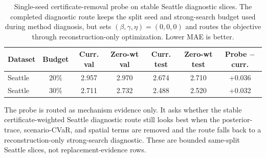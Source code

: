 \begin{table}[pos=htbp]
\centering
\caption{Single-seed certificate-removal probe on stable Seattle diagnostic slices. The completed diagnostic route keeps the split seed and strong-search budget used during method diagnosis, but sets $(\beta,\gamma,\eta)=(0,0,0)$ and routes the objective through reconstruction-only optimization. Lower MAE is better.}
\label{tab:trace-biopt-certificate-removal-probe}
\small
\begin{tabular}{lcccccc}
\toprule
Dataset & Budget & Curr. val & Zero-wt val & Curr. test & Zero-wt test & Probe $-$ curr. \\
\midrule
Seattle & 20\% & 2.957 & 2.970 & 2.674 & 2.710 & +0.036 \\
Seattle & 30\% & 2.711 & 2.732 & 2.488 & 2.520 & +0.032 \\
\bottomrule
\end{tabular}
\begin{flushleft}\footnotesize The probe is routed as mechanism evidence only. It asks whether the stable certificate-weighted Seattle diagnostic route still looks best when the posterior-trace, scenario-CVaR, and spatial terms are removed and the route falls back to a reconstruction-only strong-search diagnostic. These are bounded same-split Seattle slices, not replacement-evidence rows.\end{flushleft}
\end{table}
